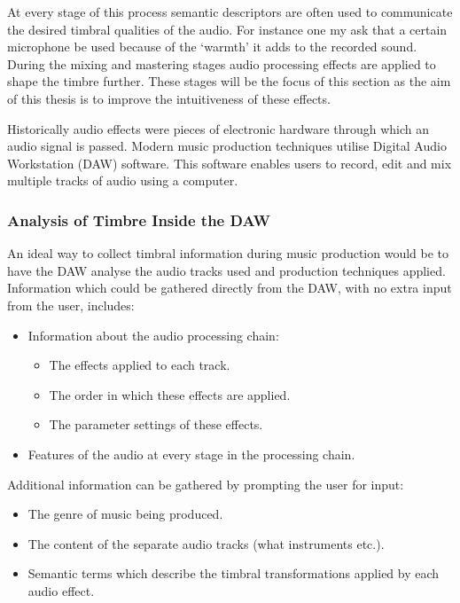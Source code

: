 			At every stage of this process semantic descriptors are often used to communicate the desired
			timbral qualities of the audio. For instance one my ask that a certain microphone be used because of
			the `warmth' it adds to the recorded sound. During the mixing and mastering stages audio processing
			effects are applied to shape the timbre further.  These stages will be the focus of this section as
			the aim of this thesis is to improve the intuitiveness of these effects.

			Historically audio effects were pieces of electronic hardware through which an audio signal is
			passed. Modern music production techniques utilise Digital Audio Workstation (DAW) software. This
			software enables users to record, edit and mix multiple tracks of audio using a computer. 
			
		\subsubsection{Analysis of Timbre Inside the DAW}
			An ideal way to collect timbral information during music production would be to have the DAW analyse
			the audio tracks used and production techniques applied. Information which could be gathered
			directly from the DAW, with no extra input from the user, includes:

			\begin{itemize}
				\item Information about the audio processing chain:
				\begin{itemize}
					\item The effects applied to each track.
					\item The order in which these effects are applied.
					\item The parameter settings of these effects.
				\end{itemize}

				\item Features of the audio at every stage in the processing chain.
			\end{itemize}

			Additional information can be gathered by prompting the user for input:

			\begin{itemize}
				\item The genre of music being produced.
				\item The content of the separate audio tracks (what instruments etc.).
				\item Semantic terms which describe the timbral transformations applied by each audio
					effect.
			\end{itemize}

